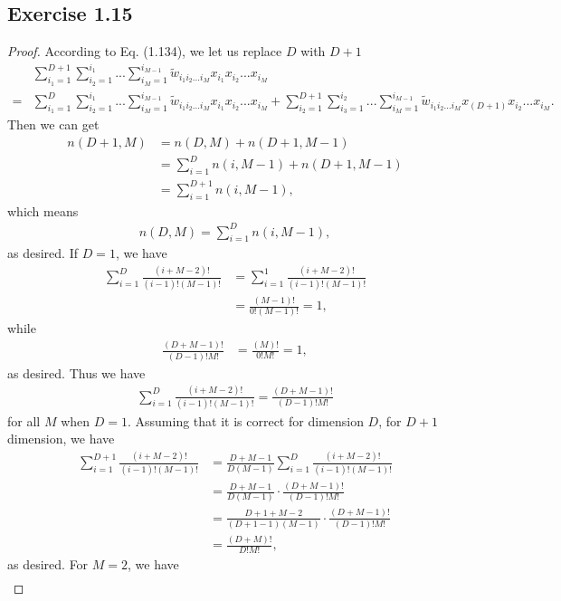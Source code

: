 \documentclass[11pt]{article}
\theoremstyle{definition}
\begin{document}
\subsection{Exercise 1.15}
\begin{proof}
According to Eq. (1.134), we let us replace $D$ with $D+1$
\begin{align*}
&\sum^{D+1}_{i_1=1}\sum^{i_1}_{i_2=1}...\sum^{i_{M-1}}_{i_M=1}\widetilde{w}_{i_1i_2...i_M}x_{i_1}x_{i_2}...x_{i_M} \\
=& \sum^{D}_{i_1=1}\sum^{i_1}_{i_2=1}...\sum^{i_{M-1}}_{i_M=1}\widetilde{w}_{i_1i_2...i_M}x_{i_1}x_{i_2}...x_{i_M} + \sum^{D+1}_{i_2=1}\sum^{i_2}_{i_3=1}...\sum^{i_{M-1}}_{i_M=1}\widetilde{w}_{i_1i_2...i_M}x_{(D+1)}x_{i_2}...x_{i_M}
.
\end{align*}
Then we can get
\begin{align*}
n(D+1,M) &= n(D,M) + n(D+1,M-1) \\
&= \sum^D_{i=1}n(i, M-1) + n(D+1,M-1) \\
&= \sum^{D+1}_{i=1}n(i, M-1),
\end{align*}
which means
\begin{align*}
n(D,M) = \sum^{D}_{i=1}n(i, M-1),
\end{align*}
as desired. If $D = 1$, we have
\begin{align*}
\sum^D_{i=1}\frac{(i+M-2)!}{(i-1)!(M-1)!} &= \sum^1_{i=1}\frac{(i+M-2)!}{(i-1)!(M-1)!} \\
&= \frac{(M-1)!}{0!(M-1)!} = 1,
\end{align*}
while
\begin{align*}
\frac{(D+M-1)!}{(D-1)!M!} &= \frac{(M)!}{0!M!} = 1,
\end{align*}
 as desired. Thus we have
 \begin{align*}
\sum^D_{i=1}\frac{(i+M-2)!}{(i-1)!(M-1)!} = \frac{(D+M-1)!}{(D-1)!M!}
\end{align*}
for all $M$ when $D=1$. Assuming that it is correct for dimension $D$, for $D+1$ dimension, we have
\begin{align*}
\sum^{D+1}_{i=1}\frac{(i+M-2)!}{(i-1)!(M-1)!} &= \frac{D+M-1}{D(M-1)}\sum^D_{i=1}\frac{(i+M-2)!}{(i-1)!(M-1)!} \\
&=\frac{D+M-1}{D(M-1)} \cdot \frac{(D+M-1)!}{(D-1)!M!} \\
&= \frac{D+1+M-2}{(D+1-1)(M-1)} \cdot \frac{(D+M-1)!}{(D-1)!M!}\\
&= \frac{(D+M)!}{D!M!},
\end{align*}
as desired. For $M=2$, we have
\begin{align*}

\end{align*}
\end{proof}
\end{document}

